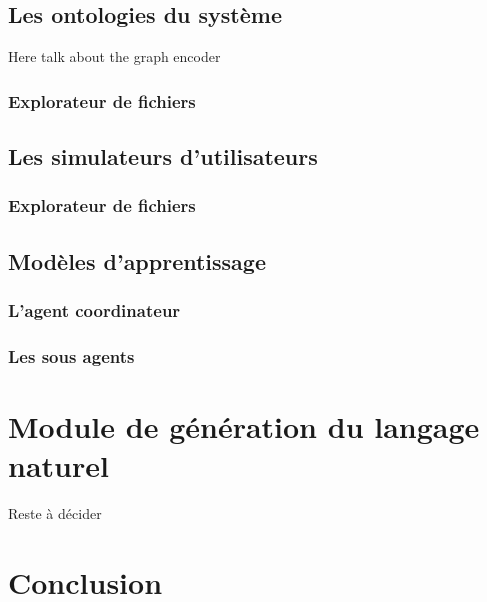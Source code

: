 	\subsection{Les ontologies du système}
		Here talk about the graph encoder 
		\subsubsection*{Explorateur de fichiers}
	\subsection{Les simulateurs d'utilisateurs}
		\subsubsection*{Explorateur de fichiers}
	\subsection{Modèles d'apprentissage}
		\subsubsection*{L'agent coordinateur}
		\subsubsection*{Les sous agents}

\section{Module de génération du langage naturel}
	Reste à décider
\section{Conclusion}	